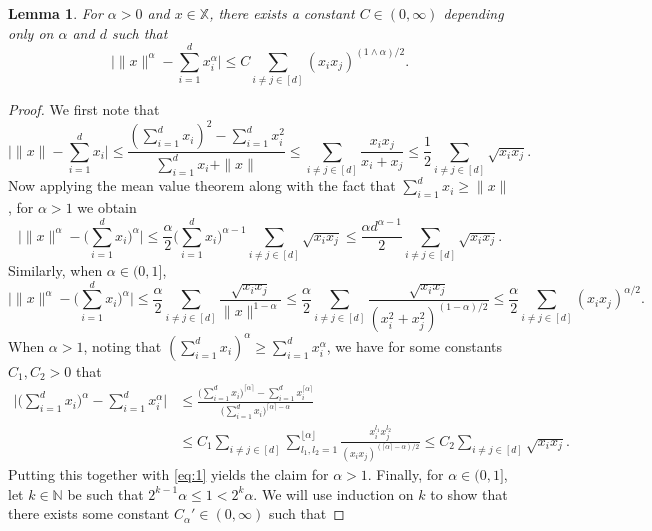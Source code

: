 \documentclass[11pt,reqno]{amsart}
\numberwithin{equation}{section}
\newtheorem{lemma}[theorem]{Lemma}
\theoremstyle{definition}
\newcommand{\N}{\mathbb{N}}
\newcommand{\XX}{\mathbb{X}}
\begin{document}
\begin{lemma}\label{lem:secord}
	For $\alpha>0$ and $x \in \XX$, there exists a constant $C \in (0,\infty)$ depending only on $\alpha$ and $d$ such that
	$$\big|\|x\|^{\alpha} - \sum_{i=1}^d x_i^{\alpha}\big| \le C \sum_{i \not = j \in [d]} (x_i x_j)^{(1 \wedge \alpha)/2}.$$
\end{lemma}
\begin{proof}
	We first note that
	\begin{equation*}
	\Big| \|x\| - \sum_{i=1}^d x_i \Big| \le \frac{(\sum_{i=1}^d x_i)^2 - \sum_{i=1}^d x_i^2}{\sum_{i=1}^d x_i + \|x\|} \le \sum_{i \not = j \in [d]} \frac{x_ix_j}{x_i+x_j} \le  \frac{1}{2} \sum_{i \not = j \in [d]} \sqrt{x_ix_j}.
	\end{equation*}
	Now applying the mean value theorem along with the fact that $\sum_{i=1}^d x_i \ge \|x\|$, for $\alpha > 1$ we obtain
	\begin{equation}\label{eq:1}
	\Big|\|x\|^{\alpha} - \Big(\sum_{i=1}^d x_i\Big)^{\alpha}\Big| \le  \frac{\alpha}{2} \Big(\sum_{i=1}^d x_i \Big)^{\alpha-1} \sum_{i \not = j \in [d]} \sqrt{x_ix_j} \le \frac{\alpha d^{\alpha-1}}{2}\sum_{i \not = j \in [d]} \sqrt{x_ix_j}.
	\end{equation}
	Similarly, when $\alpha \in (0,1]$, 
	\begin{equation}\label{eq:2}
	\Big|\|x\|^{\alpha} - \Big(\sum_{i=1}^d x_i\Big)^{\alpha} \Big| \le  \frac{\alpha}{2} \sum_{i \not = j \in [d]} \frac{\sqrt{x_ix_j}}{\|x\|^{1-\alpha}} \le \frac{\alpha}{2} \sum_{i \not = j \in [d]} \frac{\sqrt{x_ix_j}}{(x_i^2 + x_j^2)^{(1-\alpha)/2}} \le \frac{\alpha}{2} \sum_{i \not = j \in [d]} (x_ix_j)^{\alpha/2}.
	\end{equation}
	When $\alpha>1$, noting that $(\sum_{i=1}^d x_i)^{\alpha} \ge \sum_{i=1}^d x_i^\alpha$, we have for some constants $C_1,C_2>0$ that 
	\begin{align*}
	\Big|\Big(\sum_{i=1}^d x_i\Big)^{\alpha} - \sum_{i=1}^d x_i^\alpha\Big| &\le \frac{\big(\sum_{i=1}^d x_i\big)^{\lceil \alpha \rceil} - \sum_{i=1}^d x_i^{\lceil \alpha \rceil}}{\big(\sum_{i=1}^d x_i\big)^{\lceil \alpha \rceil - \alpha}} \\
	&\le C_1 \sum_{i \not = j \in [d]} \sum_{l_1,l_2=1}^{\lfloor \alpha \rfloor} \frac{x_i^{l_1} x_j^{l_2}}{(x_ix_j)^{(\lceil \alpha \rceil - \alpha)/2}} \le C_2 \sum_{i \not = j \in [d]} \sqrt{x_i x_j}.
	\end{align*}
	Putting this together with \eqref{eq:1} yields the claim for $\alpha>1$. Finally, for $\alpha \in (0,1]$, let $k \in \N$ be such that $2^{k-1} \alpha \le 1 <2^k \alpha$. We will use induction on $k$ to show that there exists some constant $C_\alpha' \in (0,\infty)$ such that

\end{proof}
\end{document}
